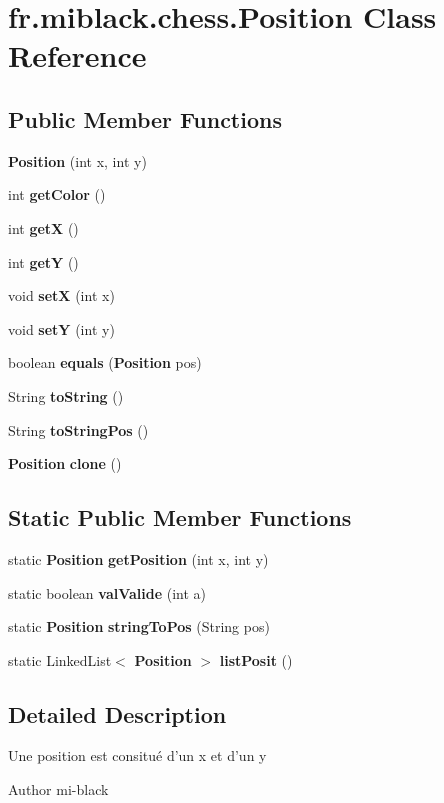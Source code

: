 \section{fr.\-miblack.\-chess.\-Position Class Reference}
\label{classfr_1_1miblack_1_1chess_1_1Position}
\subsection*{Public Member Functions}
\begin{DoxyCompactItemize}
\item 
{\bf Position} (int x, int y)
\item 
int {\bf get\-Color} ()
\item 
int {\bf get\-X} ()
\item 
int {\bf get\-Y} ()
\item 
void {\bf set\-X} (int x)
\item 
void {\bf set\-Y} (int y)
\item 
boolean {\bf equals} ({\bf Position} pos)
\item 
String {\bf to\-String} ()
\item 
String {\bf to\-String\-Pos} ()
\item 
{\bf Position} {\bf clone} ()
\end{DoxyCompactItemize}
\subsection*{Static Public Member Functions}
\begin{DoxyCompactItemize}
\item 
static {\bf Position} {\bf get\-Position} (int x, int y)
\item 
static boolean {\bf val\-Valide} (int a)
\item 
static {\bf Position} {\bf string\-To\-Pos} (String pos)
\item 
static Linked\-List$<$ {\bf Position} $>$ {\bf list\-Posit} ()
\end{DoxyCompactItemize}


\subsection{Detailed Description}
Une position est consitué d'un x et d'un y \begin{DoxyAuthor}{Author}
mi-\/black 
\end{DoxyAuthor}


